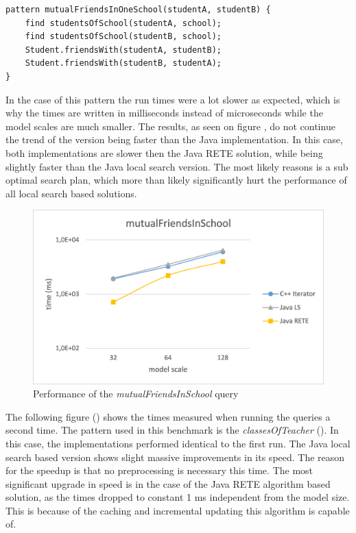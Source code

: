 \begin{lstlisting}[frame=single,float=!ht,language=IQPL,
label=listing:meas_mutualFriendsInSchool, caption=The mutualFriendsInSchool pattern]
pattern mutualFriendsInOneSchool(studentA, studentB) {
	find studentsOfSchool(studentA, school);
	find studentsOfSchool(studentB, school);
	Student.friendsWith(studentA, studentB);
	Student.friendsWith(studentB, studentA);
}
\end{lstlisting}

In the case of this pattern the run times were a lot slower as expected,
which is why the times are written in milliseconds instead of microseconds
while the model scales are much smaller. The results, as seen on figure
, do not continue the trend of the \CPP{}
version being faster than the Java implementation. In this case, both \CPP{}
implementations are slower then the Java RETE solution, while being slightly
faster than the Java local search version. The most likely reasons is a sub
optimal search plan, which more than likely significantly hurt the performance
of all local search based solutions.

\begin{figure}[!ht]
\centering
\includegraphics[width=120mm,
keepaspectratio]{figures/meas_mutualFriendsInSchool.png}
\caption{Performance of the \emph{mutualFriendsInSchool} query}
\label{fig:meas_mutualFriendsInSchool}
\end{figure}

The following figure () shows the times measured when
running the queries a second time. The pattern used in this benchmark is the
\emph{classesOfTeacher} (). In this case, the
\CPP{} implementations performed identical to the first run. The Java local
search based version shows slight massive improvements in its speed. The reason
for the speedup is that no preprocessing is necessary this time. The most
significant upgrade in speed is in the case of the Java RETE algorithm based
solution, as the times dropped to constant 1 ms independent from the model size.
This is because of the caching and incremental updating this algorithm is
capable of.


